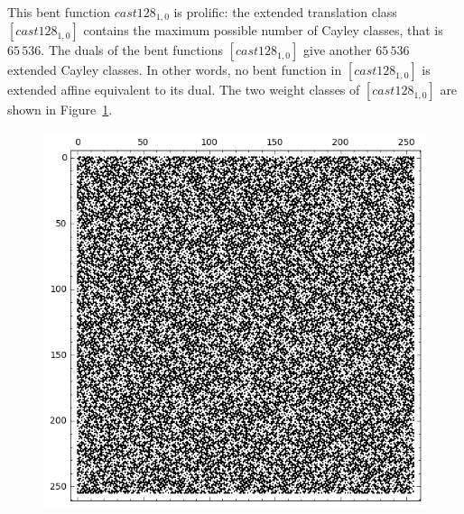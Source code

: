 \documentclass[12pt,a4paper]{article}
\begin{document}
This bent function $cast128_{1,0}$ is prolific:
the extended translation class $[cast128_{1,0}]$ contains the maximum possible number of Cayley classes,
that is $65\,536$.
The duals of the bent functions $[cast128_{1,0}]$ give another $65\,536$ extended Cayley classes.
In other words, no bent function in $[cast128_{1,0}]$ is extended affine equivalent to its dual.
The two weight classes of $[cast128_{1,0}]$ are
shown in Figure~\ref{fig:cast128_1_0_weight_class_matrix}.

\begin{figure}[!hb]
\centering
\begin{minipage}{.48\textwidth}
  \centering
\includegraphics[width=.9\linewidth]{../matrix_plot/cast128_1_0_weight_class_matrix.png}
  \label{fig:cast128_1_0_weight_class_matrix}
\end{minipage}
\begin{minipage}{.48\textwidth}
  \centering

\end{minipage}
\end{figure}
\end{document}
